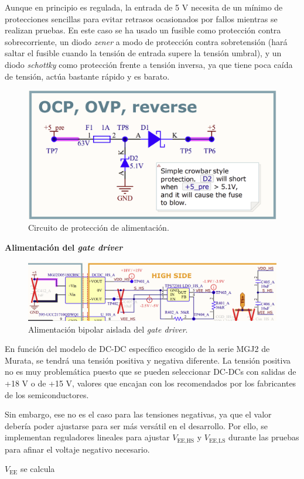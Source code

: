 Aunque en principio es regulada, la entrada de 5 V necesita de un mínimo de protecciones sencillas para evitar retrasos ocasionados por fallos mientras se realizan pruebas. En este caso se ha usado un fusible como protección contra sobrecorriente, un diodo \textit{zener} a modo de protección contra sobretensión (hará saltar el fusible cuando la tensión de entrada supere la tensión umbral), y un diodo \textit{schottky} como protección frente a tensión inversa, ya que tiene poca caída de tensión, actúa bastante rápido y es barato.
\begin{figure}[H]
	\centering
	\includegraphics[width=0.5\linewidth]{fig/5V-sch}
	\caption{Circuito de protección de alimentación.}
\end{figure}

\textbf{Alimentación del \textit{gate driver}}

\begin{figure}[H]
	\centering
	\includegraphics[width=0.9\linewidth]{fig/GD-supp-sch}
	\caption{Alimentación bipolar aislada del \textit{gate driver}.}
\end{figure}

En función del modelo de DC-DC específico escogido de la serie MGJ2 de Murata, se tendrá una tensión positiva y negativa diferente. La tensión positiva no es muy problemática puesto que se pueden seleccionar DC-DCs con salidas de +18 V o de +15 V, valores que encajan con los recomendados por los fabricantes de los semiconductores.

Sin embargo, ese no es el caso para las tensiones negativas, ya que el valor debería poder ajustarse para ser más versátil en el desarrollo. Por ello, se implementan reguladores lineales para ajustar $V_{\text{EE,HS}}$ y $V_{\text{EE,LS}}$ durante las pruebas para afinar el voltaje negativo necesario.

$V_{\text{EE}}$ se calcula 

